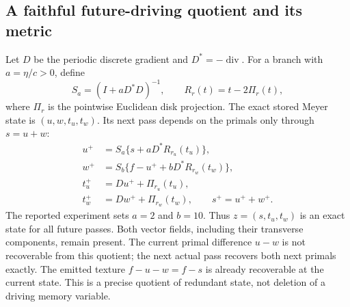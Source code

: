 \documentclass[journal]{IEEEtran}
\theoremstyle{definition}
\begin{document}
\subsection{A faithful future-driving quotient and its metric}
Let $D$ be the periodic discrete gradient and $D^*=-\operatorname{div}$.
For a branch with $a=\eta/c>0$, define
\[
 S_a=(I+aD^*D)^{-1},\qquad R_r(t)=t-2\Pi_r(t),
\]
where $\Pi_r$ is the pointwise Euclidean disk projection. The exact stored
Meyer state is $(u,w,t_u,t_w)$. Its next pass depends on the primals only
through $s=u+w$:
\begin{align}
 u^+&=S_a\{s+aD^*R_{r_u}(t_u)\},\nonumber\\
 w^+&=S_b\{f-u^++bD^*R_{r_w}(t_w)\},\nonumber\\
 t_u^+&=Du^++\Pi_{r_u}(t_u),\nonumber\\
 t_w^+&=Dw^++\Pi_{r_w}(t_w),\qquad s^+=u^++w^+.
 \label{eq:meyerquotient}
\end{align}
The reported experiment sets $a=2$ and $b=10$. Thus
$z=(s,t_u,t_w)$ is an exact state for all future passes. Both vector fields,
including their transverse components, remain present. The current primal
difference $u-w$ is not recoverable from this quotient; the next actual pass
recovers both next primals exactly. The emitted texture $f-u-w=f-s$ is
already recoverable at the current state. This is a precise quotient of
redundant state, not deletion of a driving memory variable.
\end{document}
